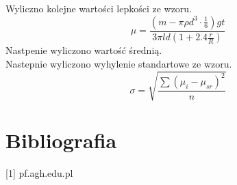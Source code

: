 \documentclass{article}
\begin{document}
Wyliczno kolejne wartości lepkości ze wzoru.
\[\mu=\frac{(m-\pi\rho d^3\cdot\frac{1}{6})gt}{3\pi ld(1+2.4\frac{r}{R})}\]
Nastpenie wyliczono wartość średnią.\\
Nastepnie wyliczono wyhylenie standartowe ze wzoru.
\[\sigma=\sqrt{\frac{\sum{{({\mu}_i-{\mu}_{sr})}^2}}{n}}\]

\section{Bibliografia}
[1] pf.agh.edu.pl
\end{document}
